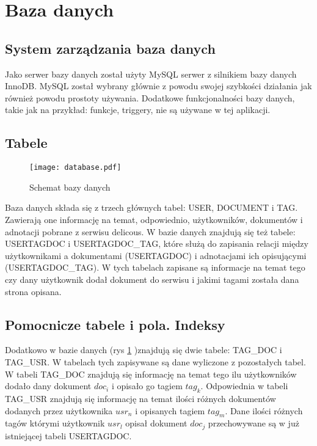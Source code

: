 \section{Baza danych}

\subsection{System zarządzania baza danych}

Jako serwer bazy danych został użyty MySQL serwer z silnikiem bazy danych InnoDB. MySQL został wybrany głównie z powodu swojej szybkości działania jak również powodu prostoty używania. Dodatkowe funkcjonalności bazy danych, takie jak na przykład: funkcje, triggery, nie są używane w tej aplikacji. 

\subsection{Tabele}


\begin{figure}[htb]
\centering
\texttt{[image: database.pdf]}
\caption{Schemat bazy danych}
\label{fig:db_fig}
\end{figure}

Baza danych składa się z trzech głównych tabel: USER, DOCUMENT i TAG. Zawierają one informację na temat, odpowiednio, użytkowników, dokumentów i adnotacji pobrane z serwisu delicous. W bazie danych znajdują się też tabele: USERTAGDOC i USERTAGDOC\_TAG, które służą do zapisania relacji między użytkownikami a dokumentami (USERTAGDOC) i adnotacjami ich opisującymi (USERTAGDOC\_TAG). W tych tabelach zapisane są  informacje na temat tego czy dany użytkownik dodał dokument do serwisu i jakimi tagami została dana strona opisana.

\subsection{Pomocnicze tabele i pola. Indeksy}
Dodatkowo w bazie danych (rys \ref{fig:db_fig} )znajdują się dwie tabele: TAG\_DOC i TAG\_USR. W tabelach tych zapisywane są dane wyliczone z pozostałych tabel. W tabeli TAG\_DOC znajdują się informację na temat tego ilu użytkowników dodało dany dokument $doc_i$  i opisało go tagiem $tag_k$. Odpowiednia w tabeli TAG\_USR znajdują się informację na temat ilości różnych dokumentów dodanych przez użytkownika $usr_n$ i opisanych tagiem $tag_m$. Dane ilości różnych tagów którymi użytkownik $usr_l$ opisał dokument $doc_j$ przechowywane są w już istniejącej tabeli USERTAGDOC. 

